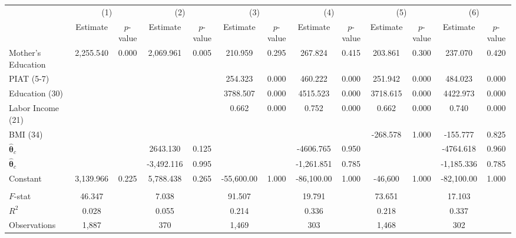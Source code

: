 \begin{tabular}{lcccccccccccc} \toprule
 & \multicolumn{2}{c}{(1)}  &  \multicolumn{2}{c}{(2)}  &  \multicolumn{2}{c}{(3)}  &  \multicolumn{2}{c}{(4)}  & \multicolumn{2}{c}{(5)} & \multicolumn{2}{c}{(6)} \\  
 & Estimate & $p$-value & Estimate & $p$-value & Estimate & $p$-value & Estimate & $p$-value & Estimate & $p$-value & Estimate & $p$-value \\ \midrule
Mother's Education &  2,255.540 &     0.000 &  2,069.961 &     0.005 &   210.959 &     0.295 &   267.824 &     0.415 &   203.861 &     0.300 &   237.070 &     0.420 \\  
PIAT (5-7) &         &         &         &         &   254.323 &     0.000 &   460.222 &     0.000 &   251.942 &     0.000 &   484.023 &     0.000 \\  
Education (30) &         &         &         &         &  3788.507 &     0.000 &  4515.523 &     0.000 &  3718.615 &     0.000 &  4422.973 &     0.000 \\  
Labor Income (21) &         &         &         &         &     0.662 &     0.000 &     0.752 &     0.000 &     0.662 &     0.000 &     0.740 &     0.000 \\  
BMI (34) &         &         &         &         &         &         &         &         &  -268.578 &     1.000 &  -155.777 &     0.825 \\  
$\hat{\bm{\theta}}_c$ &         &         &  2643.130 &     0.125 &         &         & -4606.765 &     0.950 &         &         & -4764.618 &     0.960 \\  
$\hat{\bm{\theta}}_c$ &         &         & -3,492.116 &     0.995 &         &         & -1,261.851 &     0.785 &         &         & -1,185.336 &     0.785 \\  
Constant &  3,139.966 &     0.225 &  5,788.438 &     0.265 & -55,600.00 &     1.000 & -86,100.00 &     1.000 & -46,600 &     1.000 & -82,100.00 &     1.000 \\  \\ \midrule
$F$-stat &    46.347 &     &     7.038 &     &    91.507 &    &    19.791 &     &    73.651 &     &    17.103 &   \\  
$R^2$ &     0.028 &    &     0.055 &      &     0.214 &  &     0.336 &     &     0.218 &    &     0.337 &     \\  
Observations &  1,887 &     &   370 &   &  1,469 &      &   303 &   &  1,468 &   &   302 &     \\  
\bottomrule \end{tabular}
